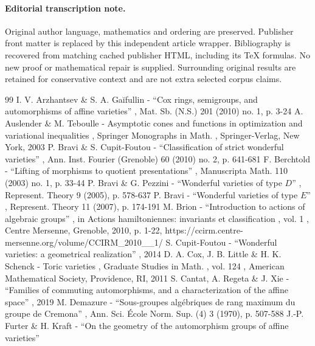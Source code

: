 \documentclass[11pt]{article}
\numberwithin{equation}{section}
\begin{document}
\paragraph{Editorial transcription note.}
Original author language, mathematics and ordering are preserved. Publisher front matter is replaced by this independent article wrapper. Bibliography is recovered from matching cached publisher HTML, including its TeX formulas. No new proof or mathematical repair is supplied. Surrounding original results are retained for conservative context and are not extra selected corpus claims.
\clearpage

\begin{thebibliography}{99}
 I. V. Arzhantsev \& S. A. Gaĭfullin - “Cox rings, semigroups, and automorphisms of affine varieties” , Mat. Sb. (N.S.) 201 (2010) no. 1, p. 3-24
 A. Auslender \& M. Teboulle - Asymptotic cones and functions in optimization and variational inequalities , Springer Monographs in Math. , Springer-Verlag, New York, 2003
 P. Bravi \& S. Cupit-Foutou - “Classification of strict wonderful varieties” , Ann. Inst. Fourier (Grenoble) 60 (2010) no. 2, p. 641-681
 F. Berchtold - “Lifting of morphisms to quotient presentations” , Manuscripta Math. 110 (2003) no. 1, p. 33-44
 P. Bravi \& G. Pezzini - “Wonderful varieties of type $D$” , Represent. Theory 9 (2005), p. 578-637
 P. Bravi - “Wonderful varieties of type $E$” , Represent. Theory 11 (2007), p. 174-191
 M. Brion - “Introduction to actions of algebraic groups” , in Actions hamiltoniennes: invariants et classification , vol. 1 , Centre Mersenne, Grenoble, 2010, p. 1-22, https://ccirm.centre-mersenne.org/volume/CCIRM\_2010\_\_1/
 S. Cupit-Foutou - “Wonderful varieties: a geometrical realization” , 2014
 D. A. Cox, J. B. Little \& H. K. Schenck - Toric varieties , Graduate Studies in Math. , vol. 124 , American Mathematical Society, Providence, RI, 2011
 S. Cantat, A. Regeta \& J. Xie - “Families of commuting automorphisms, and a characterization of the affine space” , 2019
 M. Demazure - “Sous-groupes algébriques de rang maximum du groupe de Cremona” , Ann. Sci. École Norm. Sup. (4) 3 (1970), p. 507-588
 J.-P. Furter \& H. Kraft - “On the geometry of the automorphism groups of affine varieties”

\end{thebibliography}
\end{document}

